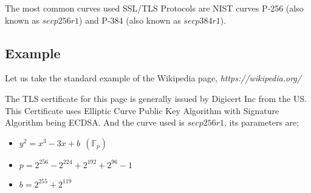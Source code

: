 \noindent The most common curves used SSL/TLS Protocols are NIST curves P-256 (also known as $secp256r1$) and P-384 (also known as $secp384r1$).

\newpage
\subsection{Example}
\noindent Let us take the standard example of the Wikipedia page, \textit{https://wikipedia.org/} \newline

\noindent The TLS certificate for this page is generally issued by Digicert Inc from the US. This Certificate uses Elliptic Curve Public Key Algorithm with Signature Algorithm being ECDSA. And the curve used is $secp256r1$, its parameters are;

\begin{itemize}
    \itemsep0em
    \item $y^2 = x^3 - 3x + b \:\: (\mathbb{F}_p)$
    \item $p = 2^{256} - 2^{224} + 2^{192} + 2^{96} - 1$
    \item $b = 2^{255} + 2^{119}$
\end{itemize}


